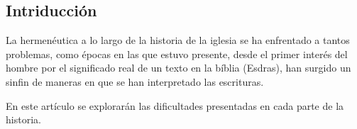 \begin{multicols}{2}
\tableofcontents


\section{Intriducción}

La hermenéutica a lo largo de la historia de la iglesia se ha enfrentado a tantos problemas, como épocas en las que estuvo presente, desde el primer interés del hombre por el significado real de un texto en la bíblia (Esdras), han surgido un sinfin de maneras en que se han interpretado las escrituras.

En este artículo se explorarán las dificultades presentadas en cada parte de la historia.

\end{multicols}